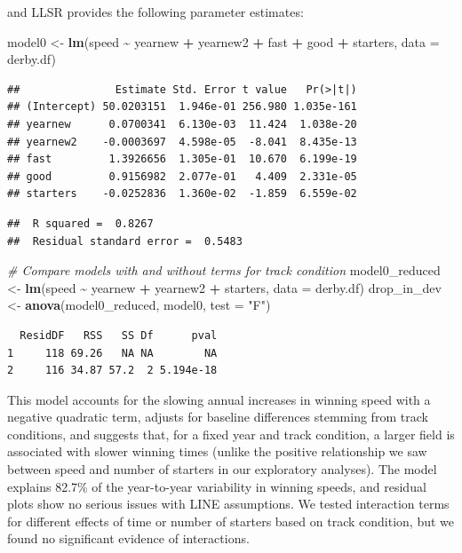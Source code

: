 \documentclass[
]{krantz}
\newenvironment{Shaded}{\begin{snugshade}}{\end{snugshade}}
\newcommand{\AttributeTok}[1]{\textcolor[rgb]{0.27,0.27,0.27}{#1}}
\newcommand{\CommentTok}[1]{\textcolor[rgb]{0.37,0.37,0.37}{\textit{#1}}}
\newcommand{\FunctionTok}[1]{\textcolor[rgb]{0.27,0.27,0.27}{\textbf{#1}}}
\newcommand{\NormalTok}[1]{#1}
\newcommand{\OtherTok}[1]{\textcolor[rgb]{0.37,0.37,0.37}{#1}}
\newcommand{\SpecialCharTok}[1]{\textcolor[rgb]{0.43,0.43,0.43}{\textbf{#1}}}
\newcommand{\StringTok}[1]{\textcolor[rgb]{0.5,0.5,0.5}{#1}}
\begin{document}
and LLSR provides the following parameter estimates:

\begin{Shaded}
\begin{Highlighting}[]
\NormalTok{model0 }\OtherTok{\textless{}{-}} \FunctionTok{lm}\NormalTok{(speed }\SpecialCharTok{\textasciitilde{}}\NormalTok{ yearnew }\SpecialCharTok{+}\NormalTok{ yearnew2 }\SpecialCharTok{+}\NormalTok{ fast }\SpecialCharTok{+}\NormalTok{ good }\SpecialCharTok{+}
\NormalTok{               starters, }\AttributeTok{data =}\NormalTok{ derby.df)}
\end{Highlighting}
\end{Shaded}

\begin{verbatim}
##               Estimate Std. Error t value   Pr(>|t|)
## (Intercept) 50.0203151  1.946e-01 256.980 1.035e-161
## yearnew      0.0700341  6.130e-03  11.424  1.038e-20
## yearnew2    -0.0003697  4.598e-05  -8.041  8.435e-13
## fast         1.3926656  1.305e-01  10.670  6.199e-19
## good         0.9156982  2.077e-01   4.409  2.331e-05
## starters    -0.0252836  1.360e-02  -1.859  6.559e-02
\end{verbatim}

\begin{verbatim}
##  R squared =  0.8267 
##  Residual standard error =  0.5483
\end{verbatim}

\begin{Shaded}
\begin{Highlighting}[]
\CommentTok{\# Compare models with and without terms for track condition}
\NormalTok{model0\_reduced }\OtherTok{\textless{}{-}} \FunctionTok{lm}\NormalTok{(speed }\SpecialCharTok{\textasciitilde{}}\NormalTok{ yearnew }\SpecialCharTok{+}\NormalTok{ yearnew2 }\SpecialCharTok{+} 
\NormalTok{                       starters, }\AttributeTok{data =}\NormalTok{ derby.df)}
\NormalTok{drop\_in\_dev }\OtherTok{\textless{}{-}} \FunctionTok{anova}\NormalTok{(model0\_reduced, model0, }\AttributeTok{test =} \StringTok{"F"}\NormalTok{)}
\end{Highlighting}
\end{Shaded}

\begin{verbatim}
  ResidDF   RSS   SS Df      pval
1     118 69.26   NA NA        NA
2     116 34.87 57.2  2 5.194e-18
\end{verbatim}

This model accounts for the slowing annual increases in winning speed with a negative quadratic term, adjusts for baseline differences stemming from track conditions, and suggests that, for a fixed year and track condition, a larger field is associated with slower winning times (unlike the positive relationship we saw between speed and number of starters in our exploratory analyses). The model explains 82.7\% of the year-to-year variability in winning speeds, and residual plots show no serious issues with LINE assumptions. We tested interaction terms for different effects of time or number of starters based on track condition, but we found no significant evidence of interactions.
\end{document}
